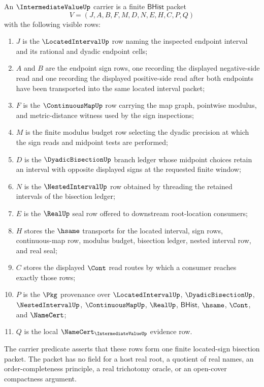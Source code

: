 \begin{definition}
\label{def:intermediate-value-located-sign-carrier}
An $\IntermediateValueUp$ carrier is a finite $\mathsf{BHist}$ packet
$$
V=(J,A,B,F,M,D,N,E,H,C,P,Q)
$$
with the following visible rows:
\begin{enumerate}
\item $J$ is the $\LocatedIntervalUp$ row naming the inspected endpoint interval and its rational and dyadic endpoint cells;
\item $A$ and $B$ are the endpoint sign rows, one recording the displayed negative-side read and one recording the displayed positive-side read after both endpoints have been transported into the same located interval packet;
\item $F$ is the $\ContinuousMapUp$ row carrying the map graph, pointwise modulus, and metric-distance witness used by the sign inspections;
\item $M$ is the finite modulus budget row selecting the dyadic precision at which the sign reads and midpoint tests are performed;
\item $D$ is the $\DyadicBisectionUp$ branch ledger whose midpoint choices retain an interval with opposite displayed signs at the requested finite window;
\item $N$ is the $\NestedIntervalUp$ row obtained by threading the retained intervals of the bisection ledger;
\item $E$ is the $\RealUp$ seal row offered to downstream root-location consumers;
\item $H$ stores the $\hsame$ transports for the located interval, sign rows, continuous-map row, modulus budget, bisection ledger, nested interval row, and real seal;
\item $C$ stores the displayed $\Cont$ read routes by which a consumer reaches exactly those rows;
\item $P$ is the $\Pkg$ provenance over $\LocatedIntervalUp$, $\DyadicBisectionUp$, $\NestedIntervalUp$, $\ContinuousMapUp$, $\RealUp$, $\mathsf{BHist}$, $\hsame$, $\Cont$, and $\NameCert$;
\item $Q$ is the local $\NameCert_{\IntermediateValueUp}$ evidence row.
\end{enumerate}
The carrier predicate asserts that these rows form one finite located-sign bisection packet. The packet has no field for a host real root, a quotient of real names, an order-completeness principle, a real trichotomy oracle, or an open-cover compactness argument.
\end{definition}

